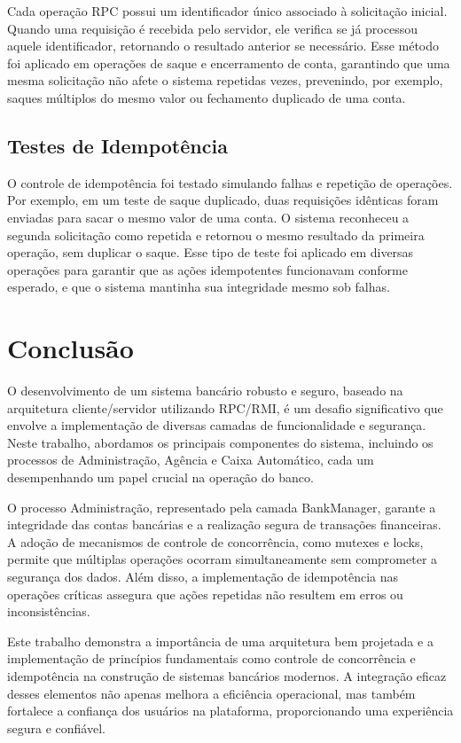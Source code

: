 \documentclass[a4paper,10pt]{article}
\begin{document}
\begin{multicols}{2}
Cada operação RPC possui um identificador único associado à solicitação inicial. Quando uma requisição é recebida pelo servidor, ele verifica se já processou aquele identificador, retornando o resultado anterior se necessário. Esse método foi aplicado em operações de saque e encerramento de conta, garantindo que uma mesma solicitação não afete o sistema repetidas vezes, prevenindo, por exemplo, saques múltiplos do mesmo valor ou fechamento duplicado de uma conta.

\subsection{Testes de Idempotência}

O controle de idempotência foi testado simulando falhas e repetição de operações. Por exemplo, em um teste de saque duplicado, duas requisições idênticas foram enviadas para sacar o mesmo valor de uma conta. O sistema reconheceu a segunda solicitação como repetida e retornou o mesmo resultado da primeira operação, sem duplicar o saque. Esse tipo de teste foi aplicado em diversas operações para garantir que as ações idempotentes funcionavam conforme esperado, e que o sistema mantinha sua integridade mesmo sob falhas.

\section{Conclusão}

O desenvolvimento de um sistema bancário robusto e seguro, baseado na arquitetura cliente/servidor utilizando RPC/RMI, é um desafio significativo que envolve a implementação de diversas camadas de funcionalidade e segurança. Neste trabalho, abordamos os principais componentes do sistema, incluindo os processos de Administração, Agência e Caixa Automático, cada um desempenhando um papel crucial na operação do banco.

O processo Administração, representado pela camada BankManager, garante a integridade das contas bancárias e a realização segura de transações financeiras. A adoção de mecanismos de controle de concorrência, como mutexes e locks, permite que múltiplas operações ocorram simultaneamente sem comprometer a segurança dos dados. Além disso, a implementação de idempotência nas operações críticas assegura que ações repetidas não resultem em erros ou inconsistências.

Este trabalho demonstra a importância de uma arquitetura bem projetada e a implementação de princípios fundamentais como controle de concorrência e idempotência na construção de sistemas bancários modernos. A integração eficaz desses elementos não apenas melhora a eficiência operacional, mas também fortalece a confiança dos usuários na plataforma, proporcionando uma experiência segura e confiável.

\end{multicols}
\end{document}
